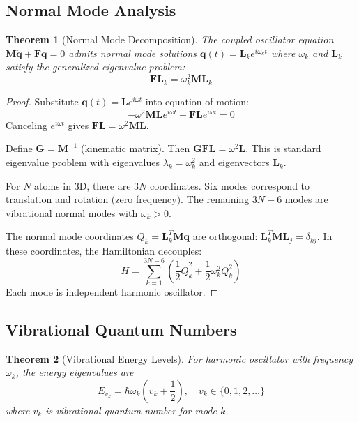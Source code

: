 \documentclass[twocolumn,10pt]{article}
\newtheorem{theorem}{Theorem}[section]
\begin{document}
\subsection{Normal Mode Analysis}

\begin{theorem}[Normal Mode Decomposition]
\label{thm:normal_modes}
The coupled oscillator equation $\mathbf{M}\ddot{\mathbf{q}} + \mathbf{F}\mathbf{q} = 0$ admits normal mode solutions $\mathbf{q}(t) = \mathbf{L}_k e^{i\omega_k t}$ where $\omega_k$ and $\mathbf{L}_k$ satisfy the generalized eigenvalue problem:
\begin{equation}
\mathbf{F}\mathbf{L}_k = \omega_k^2 \mathbf{M}\mathbf{L}_k
\end{equation}
\end{theorem}

\begin{proof}
Substitute $\mathbf{q}(t) = \mathbf{L} e^{i\omega t}$ into equation of motion:
\begin{equation}
-\omega^2 \mathbf{M}\mathbf{L} e^{i\omega t} + \mathbf{F}\mathbf{L} e^{i\omega t} = 0
\end{equation}
Canceling $e^{i\omega t}$ gives $\mathbf{F}\mathbf{L} = \omega^2 \mathbf{M}\mathbf{L}$.

Define $\mathbf{G} = \mathbf{M}^{-1}$ (kinematic matrix). Then $\mathbf{GF}\mathbf{L} = \omega^2 \mathbf{L}$. This is standard eigenvalue problem with eigenvalues $\lambda_k = \omega_k^2$ and eigenvectors $\mathbf{L}_k$.

For $N$ atoms in 3D, there are $3N$ coordinates. Six modes correspond to translation and rotation (zero frequency). The remaining $3N-6$ modes are vibrational normal modes with $\omega_k > 0$.

The normal mode coordinates $Q_k = \mathbf{L}_k^T \mathbf{M} \mathbf{q}$ are orthogonal: $\mathbf{L}_k^T \mathbf{M} \mathbf{L}_j = \delta_{kj}$. In these coordinates, the Hamiltonian decouples:
\begin{equation}
H = \sum_{k=1}^{3N-6} \left(\frac{1}{2}\dot{Q}_k^2 + \frac{1}{2}\omega_k^2 Q_k^2\right)
\end{equation}
Each mode is independent harmonic oscillator.
\end{proof}

\subsection{Vibrational Quantum Numbers}

\begin{theorem}[Vibrational Energy Levels]
\label{thm:vibrational_levels}
For harmonic oscillator with frequency $\omega_k$, the energy eigenvalues are
\begin{equation}
E_{v_k} = \hbar\omega_k\left(v_k + \frac{1}{2}\right), \quad v_k \in \{0, 1, 2, \ldots\}
\end{equation}
where $v_k$ is vibrational quantum number for mode $k$.
\end{theorem}
\end{document}
